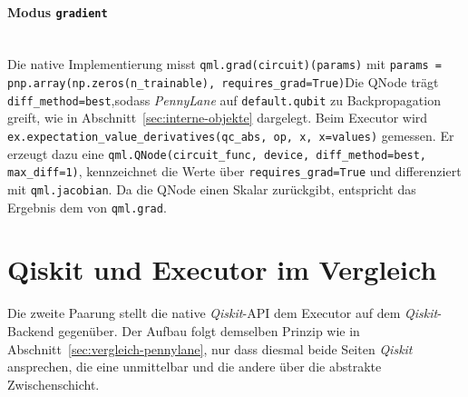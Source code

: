 \paragraph*{Modus \texttt{gradient}}\mbox{}\\
Die native Implementierung misst \texttt{qml.\allowbreak grad\allowbreak(circuit)\allowbreak(params)} mit
\texttt{params = pnp.\allowbreak array\allowbreak(np.\allowbreak zeros\allowbreak(n\_trainable), \allowbreak requires\_grad=True)}Die QNode trägt \texttt{diff\allowbreak\_method=\allowbreak\dq best\dq},sodass \textit{PennyLane} auf
\texttt{default.\allowbreak qubit} zu Backpropagation greift, wie in
Abschnitt~\ref{sec:interne-objekte} dargelegt.
Beim Executor wird \texttt{ex.\allowbreak expectation\allowbreak\_value\allowbreak\_derivatives\allowbreak(qc\allowbreak\_abs, \allowbreak op, \allowbreak \dq x\dq, \allowbreak x=values)} gemessen. Er erzeugt dazu eine \texttt{qml.\allowbreak QNode\allowbreak(circuit\allowbreak\_func, \allowbreak device, \allowbreak diff\allowbreak\_method=\allowbreak\dq best\dq, \allowbreak max\allowbreak\_diff=1)}, kennzeichnet die Werte über \texttt{requires\allowbreak\_grad=\allowbreak True} und differenziert mit \texttt{qml.\allowbreak jacobian}. Da die QNode einen Skalar zurückgibt, entspricht das Ergebnis dem von \texttt{qml.\allowbreak grad}.

\section{Qiskit und Executor im Vergleich}
\label{sec:vergleich-qiskit}

Die zweite Paarung stellt die native \textit{Qiskit}-API dem Executor auf dem
\textit{Qiskit}-Backend gegenüber. Der Aufbau folgt demselben Prinzip wie in
Abschnitt~\ref{sec:vergleich-pennylane}, nur dass diesmal beide Seiten
\textit{Qiskit} ansprechen, die eine unmittelbar und die andere über die
abstrakte Zwischenschicht.

